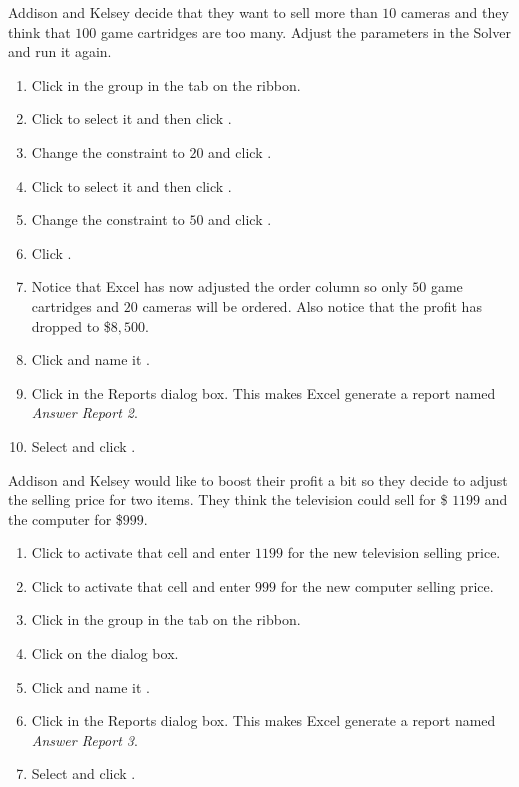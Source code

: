 Addison and Kelsey decide that they want to sell more than $ 10 $ cameras and they think that $ 100 $ game cartridges are too many. Adjust the parameters in the Solver and run it again.

\begin{enumerate}
	\item Click  in the  group in the  tab on the ribbon. 
	\item Click  to select it and then click .
	\item Change the constraint to $ 20 $ and click .
	\item Click  to select it and then click .
	\item Change the constraint to $ 50 $ and click .
	\item Click .
	\item Notice that Excel has now adjusted the order column so only $ 50 $ game cartridges and $ 20 $ cameras will be ordered. Also notice that the profit has dropped to \$$ 8,500 $. 
	\item Click  and name it .
	\item Click  in the Reports dialog box. This makes Excel generate a report named \textit{Answer Report 2}.
	\item Select  and click .
\end{enumerate}

Addison and Kelsey would like to boost their profit a bit so they decide to adjust the selling price for two items. They think the television could sell for \$ $ 1199 $ and the computer for \$$ 999 $. 

\begin{enumerate}
	\item Click  to activate that cell and enter $ 1199 $ for the new television selling price.
	\item Click  to activate that cell and enter $ 999 $ for the new computer selling price.
	\item Click  in the  group in the  tab on the ribbon. 
	\item Click  on the  dialog box.
	\item Click  and name it .
	\item Click  in the Reports dialog box. This makes Excel generate a report named \textit{Answer Report 3}.
	\item Select  and click .
\end{enumerate}

